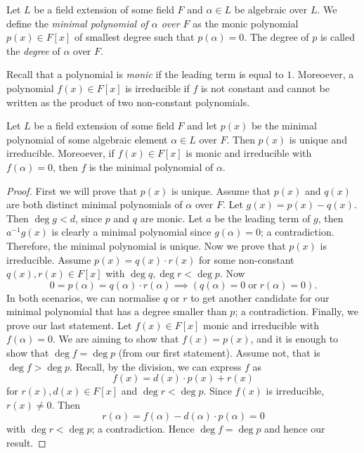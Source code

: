 
\begin{definition}
	Let $L$ be a field extension of some field $F$
	and $\alpha \in L$ be algebraic over $L$.
	We define the
	\emph{minimal polynomial of $\alpha$ over $F$}
	as the monic polynomial $p(x) \in F[x]$ 
	of smallest degree
	such that $p(\alpha) = 0$.
	The degree of $p$ is called the \emph{degree} of $\alpha$ over $F$.
\end{definition}

Recall that a polynomial is \emph{monic}
if the leading term is equal to $1$.
Moreoever, a polynomial $f(x) \in F[x]$
is irreducible if $f$ is not constant and cannot
be written as the product of two non-constant polynomials.

\begin{proposition}[]
	Let $L$ be a field extension of some field $F$
	and let $p(x)$ be the minimal polynomial of some
	algebraic element $\alpha \in L$ over $F$.
	Then $p(x)$ is unique and irreducible.
	Moreoever, if $f(x) \in F[x]$ is monic and irreducible with 
	$f(\alpha) = 0$, then $f$ is the minimal polynomial of $\alpha$.
\end{proposition}

\begin{proof}
	First we will prove that $p(x)$ is unique.
	Assume that $p(x)$ and $q(x)$ 
	are both distinct minimal polynomials of $\alpha$ over $F$.
	Let $g(x) = p(x) - q(x)$.
	Then $\deg g < d$, since $p$ and $q$ are monic.
	Let $a$ be the leading term of $g$,
	then $a^{-1}g(x)$ is clearly a minimal polynomial since
	$g(\alpha) = 0$; a contradiction.
	Therefore, the minimal polynomial is unique.
	Now we prove that $p(x)$ is irreducible.
	Assume $p(x) = q(x) \cdot r(x)$ for some non-constant
	$q(x), r(x) \in F[x]$ with $\deg q, \deg r < \deg p$.
	Now
	\[
		0 = p(\alpha) = q(\alpha) \cdot r(\alpha) 
		\implies \left( q(\alpha) = 0 \;\text{or}\; r(\alpha) = 0 \right).
	\]
	In both scenarios, we can normalise $q$ or $r$ to get another candidate for
	our minimal polynomial that has a degree smaller than $p$; a contradiction.
	Finally, we prove our last statement.
	Let $f(x) \in F[x]$ monic and irreducible with $f(\alpha) = 0$.
	We are aiming to show that $f(x) = p(x)$, and it is enough to show
	that $\deg f = \deg p$ (from our first statement).
	Assume not, that is $\deg f > \deg p$.
	Recall, by the division, we can express $f$ as
	\[
		f(x) = d(x) \cdot p(x) + r(x)
	\]
	for $r(x), d(x) \in F[x]$ and $\deg r < \deg p$.
	Since $f(x)$ is irreducible, $r(x) \neq 0$.
	Then
	\[
		r(\alpha) = f(\alpha) - d(\alpha) \cdot p(\alpha) = 0
	\]
	with $\deg r < \deg p$; a contradiction.
	Hence $\deg f = \deg p$ and hence our result.
\end{proof}

